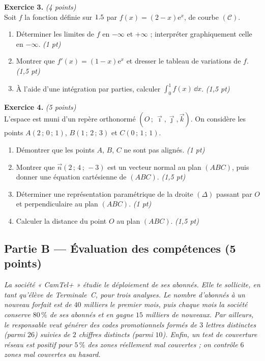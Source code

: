 \smallskip
\noindent\textbf{Exercice 3.} \hfill\textit{(4 points)}\\
Soit $f$ la fonction définie sur $1.5$ par $f(x)=(2-x)\mathrm{e}^{x}$, de courbe $(\mathcal{C})$.
\begin{enumerate}[label=\arabic*)]
\item Déterminer les limites de $f$ en $-\infty$ et $+\infty$ ; interpréter graphiquement
celle en $-\infty$. \hfill\textit{(1 pt)}
\item Montrer que $f'(x)=(1-x)\mathrm{e}^{x}$ et dresser le tableau de variations de $f$. \hfill\textit{(1,5 pt)}
\item À l'aide d'une intégration par parties, calculer $\displaystyle\int_0^{1}f(x)\,\dd x$. \hfill\textit{(1,5 pt)}
\end{enumerate}

\smallskip
\noindent\textbf{Exercice 4.} \hfill\textit{(5 points)}\\
L'espace est muni d'un repère orthonormé $(O\,;\,\vec\imath,\vec\jmath,\vec k)$. On considère
les points $A(2\,;\,0\,;\,1)$, $B(1\,;\,2\,;\,3)$ et $C(0\,;\,1\,;\,1)$.
\begin{enumerate}[label=\arabic*)]
\item Démontrer que les points $A$, $B$, $C$ ne sont pas alignés. \hfill\textit{(1 pt)}
\item Montrer que $\vec n(2\,;\,4\,;\,-3)$ est un vecteur normal au plan $(ABC)$,
puis donner une équation cartésienne de $(ABC)$. \hfill\textit{(1,5 pt)}
\item Déterminer une représentation paramétrique de la droite $(\Delta)$ passant par
$O$ et perpendiculaire au plan $(ABC)$. \hfill\textit{(1 pt)}
\item Calculer la distance du point $O$ au plan $(ABC)$. \hfill\textit{(1,5 pt)}
\end{enumerate}

\subsection*{Partie B — Évaluation des compétences \hfill (5 points)}

\noindent\textit{La société « CamTel+ » étudie le déploiement de ses abonnés. Elle te sollicite,
en tant qu'élève de Terminale~C, pour trois analyses. Le nombre d'abonnés à un nouveau
forfait est de $40$ milliers le premier mois, puis chaque mois la société conserve
$80\,\%$ de ses abonnés et en gagne $15$ milliers de nouveaux. Par ailleurs, le responsable
veut générer des codes promotionnels formés de $3$ lettres distinctes (parmi $26$) suivies
de $2$ chiffres distincts (parmi $10$). Enfin, un test de couverture réseau est positif pour
$5\,\%$ des zones réellement mal couvertes ; on contrôle $6$ zones mal couvertes au hasard.}

